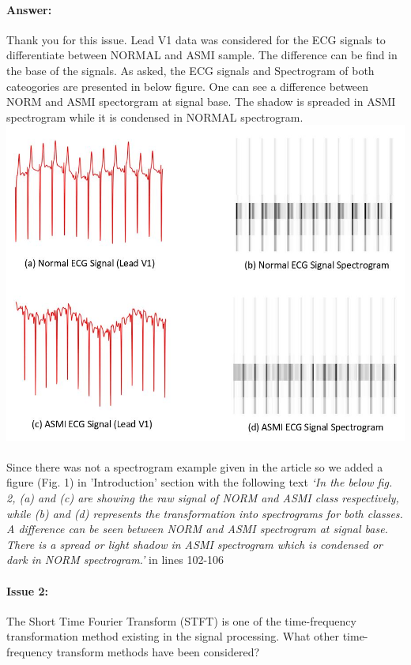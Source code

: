 \documentclass{article}
\begin{document}
\paragraph{Answer:}
Thank you for this issue. Lead V1 data was considered for the ECG signals to differentiate between NORMAL and ASMI sample. The difference can be find in the base of the signals. As asked, the ECG signals and Spectrogram of both cateogories are presented in below figure. One can see a difference between NORM and ASMI spectorgram at signal base. The shadow is spreaded in ASMI spectrogram while it is condensed in NORMAL spectrogram.
\includegraphics[scale=0.55]{Signal and spectrogram img.JPG}
\\\\
Since there was not a spectrogram example given in the article so we added a figure (Fig. 1) in 'Introduction' section with the following text \textit{`In the below fig. 2, (a) and (c) are showing the raw signal of NORM and ASMI class respectively, while (b) and (d) represents the transformation into spectrograms for both classes. A difference can be seen between NORM and ASMI spectrogram at signal base. There is a spread or light shadow in ASMI spectrogram which is condensed or dark in NORM spectrogram.'} in lines 102-106

\paragraph{Issue 2:}
\begin{displayquote}
 The Short Time Fourier Transform (STFT) is one of the time-frequency transformation method existing in the signal processing. What other time-frequency transform methods have been considered?
\end{displayquote}
\end{document}
